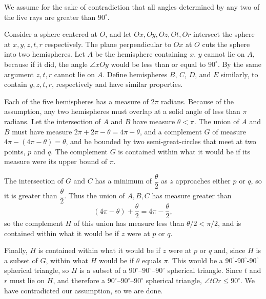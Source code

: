 \begin{solution}[name={Solution by Mij}] 
	We assume for the sake of contradiction that all angles determined by any two of the five rays are greater than $ 90^\circ$.
	
	Consider a sphere centered at $ O$, and let $ Ox,Oy,Oz,Ot,Or$ intersect the sphere at $ x, y, z, t, r$ respectively.
	The plane perpendicular to $ Ox$ at $ O$ cuts the sphere into two hemispheres.
	Let $ A$ be the hemisphere containing $ x$. $ y$ cannot lie on $ A$, because if it did, the angle $ \angle xOy$ would be less than or equal to $ 90^\circ$.
	By the same argument $ z, t, r$ cannot lie on $ A$. Define hemispheres $ B$, $ C$, $ D$, and $ E$ similarly, to contain $ y, z, t, r$, respectively and have similar properties.
	
	Each of the five hemispheres has a measure of $ 2 \pi$ radians. Because of the assumption, any two hemispheres must overlap at a solid angle of less than $ \pi$ radians. Let the intersection of $ A$ and $ B$ have measure $ \theta < \pi$.
	The union of $ A$ and $ B$ must have measure $ 2\pi + 2\pi - \theta = 4\pi - \theta$, and a complement $ G$ of measure $ 4\pi - (4\pi - \theta) = \theta$, and be bounded by two semi-great-circles that meet at two points, $ p$ and $ q$. The complement $ G$ is contained within what it would be if its measure were its upper bound of $ \pi$.
	
	The intersection of $ G$ and $ C$ has a minimum of $ \dfrac{\theta}{2}$ as $ z$ approaches either $ p$ or $ q$, so it is greater than $ \dfrac{\theta}{2}$. Thus the union of $ A, B, C$ has measure greater than 
	$$ (4\pi - \theta) + \dfrac{\theta}{2} = 4\pi - \dfrac{\theta}{2},$$ so the complement $ H$ of this union has measure less than $\theta/2 < \pi/2$, and is contained within what it would be if $ z$ were at $ p$ or $ q$.
	
	Finally, $ H$ is contained within what it would be if $ z$ were at $ p$ or $ q$ and, since $ H$ is a subset of $ G$, within what $ H$ would be if $ \theta$ equals $ \pi$. This would be a $ 90^\circ$-$ 90^\circ$-$ 90^\circ$ spherical triangle, so $ H$ is a subset of a $ 90^\circ$--$ 90^\circ$--$ 90^\circ$ spherical triangle. Since $ t$ and $ r$ must lie on $ H$, and therefore a $ 90^\circ$--$ 90^\circ$--$ 90^\circ$ spherical triangle, $ \angle tOr \le 90^\circ$. We have contradicted our assumption, so we are done.
\end{solution}



